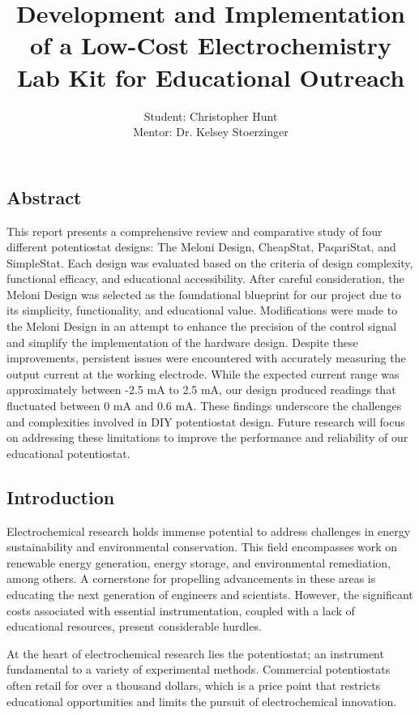 \documentclass{article}
\title{\textcolor{mycolor}{\textbf{{\huge Development and Implementation of a Low-Cost Electrochemistry Lab Kit for Educational Outreach}}}}
\author{Student: Christopher Hunt \\ Mentor: Dr. Kelsey Stoerzinger}
\date{}
\begin{document}
\pagestyle{fancy}
\fancyhf{}
\rfoot{}
\rhead{\thepage}
\maketitle


\subsection*{Abstract}


This report presents a comprehensive review and comparative study of four different potentiostat designs: The Meloni Design, CheapStat, PaqariStat, and SimpleStat. Each design was evaluated based on the criteria of design complexity, functional efficacy, and educational accessibility. After careful consideration, the Meloni Design was selected as the foundational blueprint for our project due to its simplicity, functionality, and educational value. Modifications were made to the Meloni Design in an attempt to enhance the precision of the control signal and simplify the implementation of the hardware design. Despite these improvements, persistent issues were encountered with accurately measuring the output current at the working electrode. While the expected current range was approximately between -2.5 mA to 2.5 mA, our design produced readings that fluctuated between 0 mA and 0.6 mA. These findings underscore the challenges and complexities involved in DIY potentiostat design. Future research will focus on addressing these limitations to improve the performance and reliability of our educational potentiostat.


\subsection*{Introduction}
Electrochemical research holds immense potential to address challenges in energy sustainability and environmental conservation. This field encompasses work on renewable energy generation, energy storage, and environmental remediation, among others. A cornerstone for propelling advancements in these areas is educating the next generation of engineers and scientists. However, the significant costs associated with essential instrumentation, coupled with a lack of educational resources, present considerable hurdles.


At the heart of electrochemical research lies the potentiostat; an instrument fundamental to a variety of experimental methods. Commercial potentiostats often retail for over a thousand dollars, which is a price point that restricts educational opportunities and limits the pursuit of electrochemical innovation.
\end{document}
